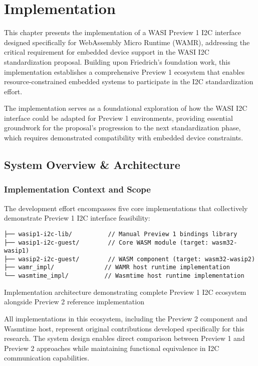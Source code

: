 \chapter{Implementation}
\label{chap:implementation}

This chapter presents the implementation of a WASI Preview 1 I2C interface designed specifically for WebAssembly Micro Runtime (WAMR), addressing the critical requirement for embedded device support in the WASI I2C standardization proposal. Building upon Friedrich's foundation work, this implementation establishes a comprehensive Preview 1 ecosystem that enables resource-constrained embedded systems to participate in the I2C standardization effort.

The implementation serves as a foundational exploration of how the WASI I2C interface could be adapted for Preview 1 environments, providing essential groundwork for the proposal's progression to the next standardization phase, which requires demonstrated compatibility with embedded device constraints.

\section{System Overview \& Architecture}
\label{sec:system-overview}

\subsection{Implementation Context and Scope}

The development effort encompasses five core implementations that collectively demonstrate Preview 1 I2C interface feasibility:

\begin{listing}[H]
\begin{verbatim}
├── wasip1-i2c-lib/          // Manual Preview 1 bindings library
├── wasip1-i2c-guest/        // Core WASM module (target: wasm32-wasip1)
├── wasip2-i2c-guest/        // WASM component (target: wasm32-wasip2)
├── wamr_impl/              // WAMR host runtime implementation
└── wasmtime_impl/          // Wasmtime host runtime implementation
\end{verbatim}
\caption{Implementation architecture demonstrating complete Preview 1 I2C ecosystem alongside Preview 2 reference implementation}
\label{lst:repo-structure}
\end{listing}

All implementations in this ecosystem, including the Preview 2 component and Wasmtime host, represent original contributions developed specifically for this research. The system design enables direct comparison between Preview 1 and Preview 2 approaches while maintaining functional equivalence in I2C communication capabilities.

